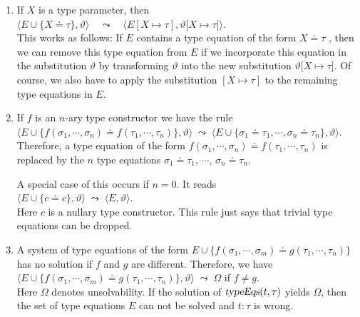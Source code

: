 \begin{enumerate}
\item If $X$ is a type parameter, then 
      \\[0.2cm]
      \hspace*{1.3cm}
      $\Big\langle E \cup \big\{ X \doteq \tau \big\}, \vartheta \Big\rangle \quad\leadsto\quad 
       \Big\langle E[X \mapsto \tau], \vartheta\big[ X \mapsto \tau \big] \Big\rangle$.
      \\[0.2cm]
      This works as follows:  If $E$ contains a type equation of the form $X \doteq \tau$      , 
      then we can remove this type equation from $E$ if we incorporate this equation
      in the substitution $\vartheta$ by transforming $\vartheta$ into the new substitution
      $\vartheta\big[ X \mapsto \tau \big]$.  Of course, we also have to apply the
      substitution $[X \mapsto \tau]$ to the remaining type equations in $E$.
\item If $f$ is an $n$-ary type constructor we have the rule
      \\[0.2cm]
      \hspace*{1.3cm}
      $\Big\langle E \cup \big\{ f(\sigma_1,\cdots,\sigma_n) \doteq f(\tau_1,\cdots,\tau_n) \big\}, 
        \vartheta \Big\rangle 
        \;\leadsto\; 
        \Big\langle E \cup \big\{ \sigma_1 \doteq \tau_1, \cdots, \sigma_n \doteq \tau_n\}, 
        \vartheta \Big\rangle$.
      \\[0.2cm]
      Therefore, a type equation of the form $f(\sigma_1,\cdots,\sigma_n) \doteq f(\tau_1,\cdots,\tau_n)$
      is replaced by the  $n$ type equations  
      $\sigma_1 \doteq \tau_1$, $\cdots$, $\sigma_n \doteq \tau_n$.

      A special case of this occurs if $n=0$.  It reads
      \\[0.2cm]
      \hspace*{1.3cm}
      $\Big\langle E \cup \big\{ c \doteq c \big\}, \vartheta \Big\rangle \;\leadsto\; 
       \Big\langle E, \vartheta \Big\rangle$.
      \\[0.2cm]
      Here $c$ is a nullary type constructor.   This rule just says that trivial 
      type equations can be dropped.
\item A system of type equations of the form  $E \cup \big\{ f(\sigma_1,\cdots,\sigma_m) \doteq g(\tau_1,\cdots,\tau_n) \big\}$
      has no solution if $f$ and $g$ are different.   Therefore, we have
      \\[0.2cm]
      \hspace*{1.3cm}
      $\Big\langle E \cup \big\{ f(\sigma_1,\cdots,\sigma_m) \doteq g(\tau_1,\cdots,\tau_n) \big\}, 
       \vartheta \Big\rangle 
         \;\leadsto\; \Omega$  \quad if $f \not= g$.
      \\[0.2cm]
      Here $\Omega$ denotes unsolvability.  If the solution of $\textsl{typeEqs}(t,\tau)$ yields $\Omega$,
      then the set of type equations $E$ can not be solved and  $t:\tau$ 
      is wrong.  \eox
\end{enumerate}


